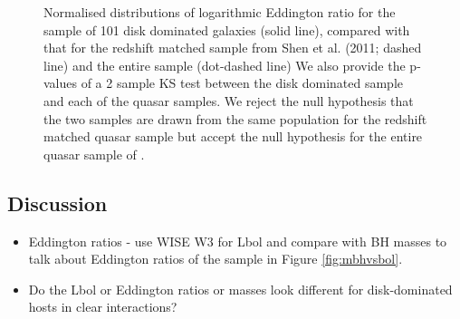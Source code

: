 \begin{figure}
\caption[Eddington ratio distribution of the bulgeless AGN sample]{Normalised distributions of logarithmic Eddington ratio for the sample of 101 disk dominated galaxies (solid line), compared with that for the redshift matched sample from Shen et al. (2011; dashed line) and the entire sample (dot-dashed line) We also provide the p-values of a 2 sample KS test between the disk dominated sample and each of the quasar samples. We reject the null hypothesis that the two samples are drawn from the same population for the redshift matched quasar sample but accept the null hypothesis for the entire quasar sample of \citet{shen11}.  
}
\label{fig:eddratioshen}
\end{figure}


%
%  
\subsection{Discussion}\label{sec:discussion}
%
%

\begin{itemize}
\item Eddington ratios - use WISE W3 for Lbol and compare with BH masses to talk about Eddington ratios of the sample in Figure \ref{fig:mbhvsbol}.


\item Do the Lbol or Eddington ratios or masses look different for disk-dominated hosts in clear interactions?

\end{itemize}


